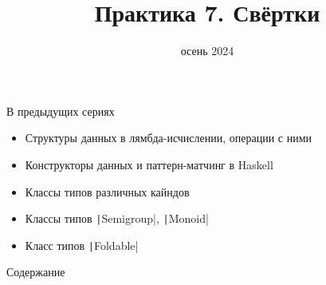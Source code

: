 
\newif\ifhandout




\title[7. Свёртки]{Практика 7. Свёртки}
\date{осень 2024}



    \setcounter{framenumber}{-1}
    \mymaketitle

    \begin{frame}[fragile]{В предыдущих сериях}
        \begin{itemize}
            \item Структуры данных в лямбда-исчислении, операции с ними
            \item Конструкторы данных и паттерн-матчинг в Haskell
            \item Классы типов различных кайндов
            \item[\newtopic] Классы типов \texttt|Semigroup|, \texttt|Monoid|
            \item[\newtopic] Класс типов \texttt|Foldable|
        \end{itemize}
    \end{frame}

    \begin{frame}[noframenumbering]{Содержание}
        \tableofcontents
    \end{frame}


